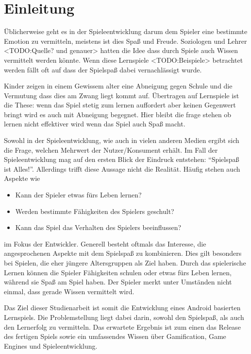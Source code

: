 \section{Einleitung}
	Üblicherweise geht es in der Spieleentwicklung darum dem Spieler eine bestimmte Emotion zu vermitteln, meistens ist dies Spaß und Freude. Soziologen und Lehrer <TODO:Quelle? und genauer> hatten die Idee dass durch Spiele auch Wissen vermittelt werden könnte. Wenn diese Lernspiele <TODO:Beispiele> betrachtet werden fällt oft auf dass der Spielspaß dabei vernachlässigt wurde.

	Kinder zeigen in einem Gewissem alter eine Abneigung gegen Schule und die Vermutung dass dies am Zwang liegt kommt auf. Übertragen auf Lernspiele ist die These: wenn das Spiel stetig zum lernen auffordert aber keinen Gegenwert bringt wird es auch mit Abneigung begegnet.
	Hier bleibt die frage stehen ob lernen nicht effektiver wird wenn das Spiel auch Spaß macht.


	Sowohl in der Spieleentwicklung, wie auch in vielen anderen Medien ergibt sich die Frage, welchen Mehrwert der Nutzer/Konsument erhält. Im Fall der Spieleentwicklung mag auf den ersten Blick der Eindruck entstehen: \enquote{Spielspaß ist Alles!}.
	Allerdings trifft diese Aussage nicht die Realität. Häufig stehen auch Aspekte wie
	\begin{itemize}
		\item{ Kann der Spieler etwas fürs Leben lernen? }
		\item{ Werden bestimmte Fähigkeiten des Spielers geschult? }
		\item{ Kann das Spiel das Verhalten des Spielers beeinflussen? }
	\end{itemize}
	im Fokus der Entwickler. Generell besteht oftmals das Interesse, die angesprochenen Aspekte mit dem Spielspaß zu kombinieren. Dies gilt besonders bei Spielen, die eher jüngere Altersgruppen als Ziel haben. Durch das spielerische Lernen können die Spieler Fähigkeiten schulen oder etwas fürs Leben lernen, während sie Spaß am Spiel haben. Der Spieler merkt unter Umständen nicht einmal, dass gerade Wissen vermittelt wird.

	Das Ziel dieser Studienarbeit ist somit die Entwicklung eines Android basierten Lernspiels. Die Problemstellung liegt dabei darin, sowohl den Spielspaß, als auch den Lernerfolg zu vermitteln. Das erwartete Ergebnis ist zum einen das Release des fertigen Spiels sowie ein umfassendes Wissen über Gamification, Game Engines und Spieleentwicklung.

